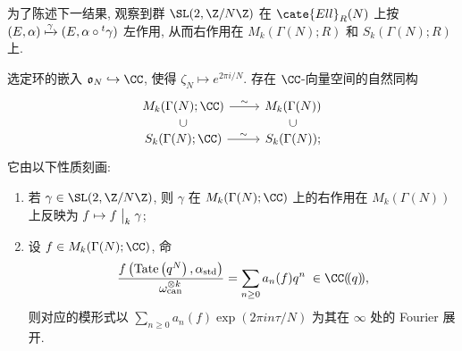 为了陈述下一结果, 观察到群 $\SL(2,\Z/N\Z)$ 在 $\cate{Ell}_R(N)$ 上按 $(E, \alpha) \xmapsto{\gamma} (E, \alpha \circ {}^t \gamma)$ 左作用, 从而右作用在 $M_k(\Gamma(N); R)$ 和 $S_k(\Gamma(N); R)$ 上.
\begin{theorem}\label{prop:modular-law}
	选定环的嵌入 $\mathfrak{o}_N \hookrightarrow \CC$, 使得 $\zeta_N \mapsto e^{2\pi i/N}$. 存在 $\CC$-向量空间的自然同构
	\[\begin{tikzcd}[row sep=small]
		M_k(\Gamma(N); \CC) \arrow[r, "\sim"] & M_k(\Gamma(N)) \\
		S_k(\Gamma(N); \CC) \arrow[r, "\sim"] \arrow[phantom, u, "\subset" description, sloped] & S_k(\Gamma(N)); \arrow[phantom, u, "\subset" description, sloped]
	\end{tikzcd}\]
	它由以下性质刻画:
	\begin{enumerate}
		\item 若 $\gamma \in \SL(2,\Z/N\Z)$, 则 $\gamma$ 在 $M_k(\Gamma(N); \CC)$ 上的右作用在 $M_k(\Gamma(N))$ 上反映为 $f \mapsto f \;\big|_{k} \; \gamma$;
		\item 设 $f \in M_k(\Gamma(N); \CC)$, 命
		\[ \dfrac{f\left( \mathrm{Tate}\left(q^N\right), \alpha_{\mathrm{std}} \right)}{\omega_{\mathrm{can}}^{\otimes k}} = \sum_{n \geq 0} a_n(f) q^n \; \in \CC(\!(q)\!), \]
		则对应的模形式以 $\sum_{n \geq 0} a_n(f) \exp\left( 2\pi in\tau /N\right)$ 为其在 $\infty$ 处的 Fourier 展开.
	\end{enumerate}
\end{theorem}
